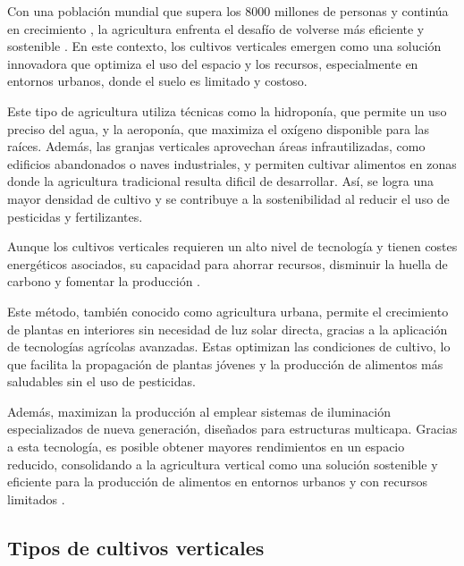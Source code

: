 Con una población mundial que supera los 8000 millones de personas y continúa en crecimiento \cite{PEOPLE}, la agricultura enfrenta el desafío de volverse más eficiente y sostenible \cite{AGUA} \cite{FAO} \cite{SANTANDER}. En este contexto, los cultivos verticales emergen como una solución innovadora que optimiza el uso del espacio y los recursos, especialmente en entornos urbanos, donde el suelo es limitado y costoso.

Este tipo de agricultura utiliza técnicas como la hidroponía, que permite un uso preciso del agua, y la aeroponía, que maximiza el oxígeno disponible para las raíces. Además, las granjas verticales aprovechan áreas infrautilizadas, como edificios abandonados o naves industriales, y permiten cultivar alimentos en zonas donde la agricultura tradicional resulta dificil de desarrollar. Así, se logra una mayor densidad de cultivo y se contribuye a la sostenibilidad al reducir el uso de pesticidas y fertilizantes.

Aunque los cultivos verticales requieren un alto nivel de tecnología y tienen costes energéticos asociados, su capacidad para ahorrar recursos, disminuir la huella de carbono y fomentar la producción \cite{alhwarin2020vertical}.

Este método, también conocido como agricultura urbana, permite el crecimiento de plantas en interiores sin necesidad de luz solar directa, gracias a la aplicación de tecnologías agrícolas avanzadas. Estas optimizan las condiciones de cultivo, lo que facilita la propagación de plantas jóvenes y la producción de alimentos más saludables sin el uso de pesticidas.

Además, maximizan la producción al emplear sistemas de iluminación especializados de nueva generación, diseñados para estructuras multicapa. Gracias a esta tecnología, es posible obtener mayores rendimientos en un espacio reducido, consolidando a la agricultura vertical como una solución sostenible y eficiente para la producción de alimentos en entornos urbanos y con recursos limitados \cite{SANTANDER}.

\subsection{Tipos de cultivos verticales}



